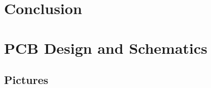 \documentclass[11pt,letterpaper]{article}
\begin{document}
\section{Conclusion}
\label{sec:conclusion}

\clearpage

{}

\clearpage

\appendix
\section{PCB Design and Schematics}
\label{sec:appendix-schematics}

\clearpage

\begin{landscape}
\section{Pictures}
\label{sec:appendix-pictures}

\end{landscape}
\clearpage

%
%

%
%
\end{document}
